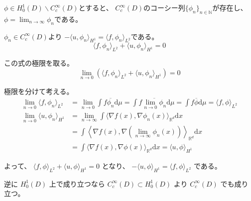 \documentclass[12pt,b5paper]{ltjsarticle}
\begin{document}
\begin{description}
            $\phi \in H_{0}^{1}(D) \backslash C_{c}^{\infty}(D)$とすると、
            $C_{c}^{\infty}(D)$のコーシー列$\{\phi_{n}\}_{n\in\mathbb{N}}$が存在し、
            $\phi = \lim_{n\to\infty}\phi_{n}$である。

            $\phi_{n}\in C_{c}^{\infty}(D)$より
            $-\langle u,\phi_{n} \rangle _{H^{1}}=\langle f,\phi_{n} \rangle_{L^{2}}$である。
            \begin{equation}
             \langle f,\phi_{n} \rangle_{L^{2}}+\langle u,\phi_{n} \rangle _{H^{1}}=0
            \end{equation}

            この式の極限を取る。
            \begin{equation}
             \lim_{n\to0}
              \left(\langle f,\phi_{n} \rangle_{L^{2}}+\langle u,\phi_{n} \rangle _{H^{1}}\right)
              =0
            \end{equation}


            極限を分けて考える。
            \begin{align}
             \lim_{n\to0} \langle f,\phi_{n} \rangle_{L^{2}}
             &=
             \lim_{n\to0} \int f \overline{\phi_{n}} \mathrm{d}\mu
             = \int f \overline{\lim_{n\to0} \phi_{n}} \mathrm{d}\mu
             = \int f \overline{\phi} \mathrm{d}\mu
             = \langle f,\phi \rangle_{L^{2}}\\
             \lim_{n\to0} \langle u,\phi_{n} \rangle _{H^{1}}
             &= \lim_{n\to\infty}
             \int \langle \nabla f(x), \nabla \phi_{n}(x) \rangle_{\mathbb{R}^{d}} \mathrm{d}x\\
             &= \int \left\langle \nabla f(x), \nabla \left(\lim_{n\to\infty}\phi_{n}(x)\right) \right\rangle_{\mathbb{R}^{d}} \mathrm{d}x\\
             &=\int \langle \nabla f(x), \nabla \phi(x) \rangle_{\mathbb{R}^{d}} \mathrm{d}x
             = \langle u,\phi \rangle _{H^{1}}
            \end{align}

            よって、
            $\langle f,\phi \rangle_{L^{2}}+\langle u,\phi \rangle _{H^{1}}=0$
            となり、
            $-\langle u,\phi \rangle _{H^{1}}=\langle f,\phi \rangle_{L^{2}}$
            である。
            
            逆に
            $H_{0}^{1}(D)$
            上で成り立つなら
            $C_{c}^{\infty}(D) \subset H_{0}^{1}(D)$
            より
            $C_{c}^{\infty}(D)$
            でも成り立つ。


\end{description}
\end{document}
